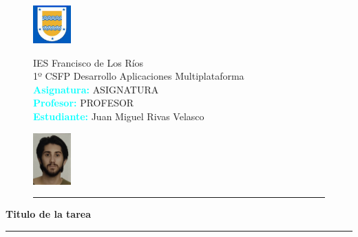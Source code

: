 \documentclass[12pt,a4paper]{article}
\begin{document}
    \thispagestyle{empty}

    \begin{figure}
        
        \noindent%
        \raggedleft
        \includegraphics[width=0.13\textwidth,fbox]{logo.png}%
        \begin{minipage}[b]{0.7\textwidth}
            \centering
            IES Francisco de Los Ríos \\
            1º CSFP Desarrollo Aplicaciones Multiplataforma\\
           \textcolor{cyan}{\textbf{Asignatura: }}ASIGNATURA\\
           \textcolor{cyan}{\textbf{Profesor: }}PROFESOR\\
           \textcolor{cyan}{\textbf{Estudiante: }}Juan Miguel Rivas Velasco
        \end{minipage}%
        \raggedright
        \includegraphics[width=0.13\textwidth,fbox]{foto.png}
        \textcolor{blue}{\rule{17cm}{0.5mm}}
    \end{figure}
    
    \centering
    \textcolor{prussianblue}{\LARGE{\textbf{Titulo de la tarea}}}
    \textcolor{blue}{\rule{17cm}{0.5mm}}
    

  
\end{document}
